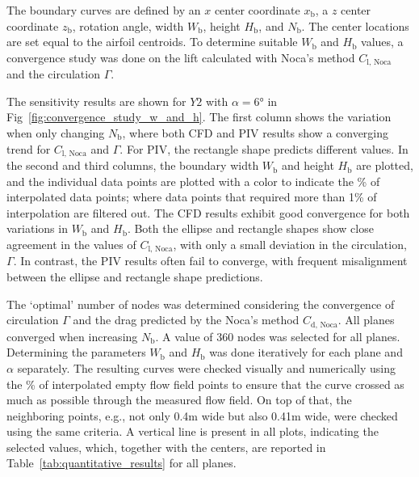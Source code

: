 \documentclass[wes, manuscript]{copernicus}
\begin{document}
The boundary curves are defined by an $x$ center coordinate $x_{\textrm{b}}$, a $z$ center coordinate $z_{\textrm{b}}$, rotation angle, width $W_{\textrm{b}}$, height $H_{\textrm{b}}$, and $N_{\textrm{b}}$. The center locations are set equal to the airfoil centroids. To determine suitable $W_{\textrm{b}}$ and $H_{\textrm{b}}$ values, a convergence study was done on the lift calculated with Noca's method $C_{\textrm{l, Noca}}$ and the circulation $\Gamma$.

The sensitivity results are shown for $Y2$ with $\alpha=6$\unit{\degree} in Fig~\ref{fig:convergence_study_w_and_h}. The first column shows the variation when only changing $N_{\textrm{b}}$, where both CFD and PIV results show a converging trend for $C_{\textrm{l, Noca}}$ and $\Gamma$. For PIV, the rectangle shape predicts different values. In the second and third columns, the boundary width $W_{\textrm{b}}$ and height $H_{\textrm{b}}$ are plotted, and the individual data points are plotted with a color to indicate the \% of interpolated data points; where data points that required more than 1\% of interpolation are filtered out. The CFD results exhibit good convergence for both variations in $W_{\textrm{b}}$ and $H_{\textrm{b}}$. Both the ellipse and rectangle shapes show close agreement in the values of $C_{\textrm{l, Noca}}$, with only a small deviation in the circulation, $\Gamma$. In contrast, the PIV results often fail to converge, with frequent misalignment between the ellipse and rectangle shape predictions.

The `optimal' number of nodes was determined considering the convergence of circulation $\Gamma$ and the drag predicted by the Noca's method $C_{\textrm{d, Noca}}$. All planes converged when increasing $N_{\textrm{b}}$. A value of 360 nodes was selected for all planes.
Determining the parameters $W_{\textrm{b}}$ and $H_{\textrm{b}}$ was done iteratively for each plane and $\alpha$ separately. The resulting curves were checked visually and numerically using the \% of interpolated empty flow field points to ensure that the curve crossed as much as possible through the measured flow field. On top of that, the neighboring points, e.g., not only 0.4\unit{m} wide but also 0.41\unit{m} wide, were checked using the same criteria. A vertical line is present in all plots, indicating the selected values, which, together with the centers, are reported in Table~\ref{tab:quantitative_results} for all planes.
\end{document}
